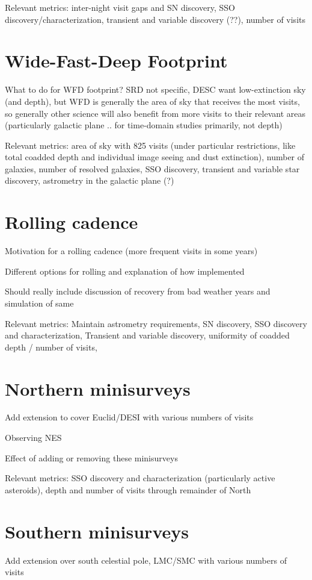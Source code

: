 Relevant metrics: inter-night visit gaps and SN discovery, SSO discovery/characterization, transient and variable discovery (??), number of visits

\section{Wide-Fast-Deep Footprint}
What to do for WFD footprint? SRD not specific, DESC want low-extinction sky (and depth), but WFD is generally the area of sky that receives the most visits, so generally other science will also benefit from more visits to their relevant areas (particularly galactic plane .. for time-domain studies primarily, not depth)

Relevant metrics: area of sky with 825 visits (under particular restrictions, like total coadded depth and individual image seeing and dust extinction), number of galaxies, number of resolved galaxies, SSO discovery, transient and variable star discovery, astrometry in the galactic plane (?)


\section{Rolling cadence}
Motivation for a rolling cadence (more frequent visits in some years)

Different options for rolling and explanation of how implemented

Should really include discussion of recovery from bad weather years and simulation of same

Relevant metrics: Maintain astrometry requirements, SN discovery, SSO discovery and characterization,  Transient and variable discovery, uniformity of coadded depth / number of visits, 

\section{Northern minisurveys}
Add extension to cover Euclid/DESI with various numbers of visits

Observing NES 

Effect of adding or removing these minisurveys

Relevant metrics: SSO discovery and characterization (particularly active asteroids), depth and number of visits through remainder of North

\section{Southern minisurveys}
Add extension over south celestial pole, LMC/SMC with various numbers of visits

